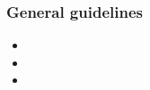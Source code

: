 

\begin{frame}
\frametitle{General guidelines} 
\begin{itemize} 
\item 
\item 
\item 
\end{itemize} 
\end{frame} 



